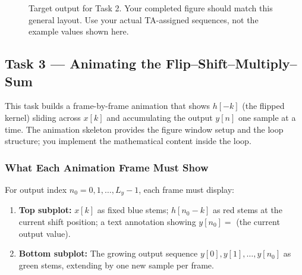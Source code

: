 \documentclass[11pt,letterpaper]{article}
\begin{document}
\begin{figure}[H]
    \centering
    \vspace{0.3in}
    \vspace{0.1in}
    \caption{Target output for Task 2. Your completed figure should match this general layout. Use your actual TA-assigned sequences, not the example values shown here.}
    \label{fig:matlab_subplot_target}
\end{figure}

\subsection{Task 3 --- Animating the Flip--Shift--Multiply--Sum}

This task builds a frame-by-frame animation that shows $h[-k]$ (the flipped kernel) sliding across $x[k]$ and accumulating the output $y[n]$ one sample at a time. The animation skeleton provides the figure window setup and the loop structure; you implement the mathematical content inside the loop.

\subsubsection{What Each Animation Frame Must Show}

For output index $n_0 = 0, 1, \ldots, L_y - 1$, each frame must display:
\begin{enumerate}
    \item \textbf{Top subplot:} $x[k]$ as fixed blue stems; $h[n_0 - k]$ as red stems at the current shift position; a text annotation showing $y[n_0] = $ (the current output value).
    \item \textbf{Bottom subplot:} The growing output sequence $y[0], y[1], \ldots, y[n_0]$ as green stems, extending by one new sample per frame.
\end{enumerate}
\end{document}

